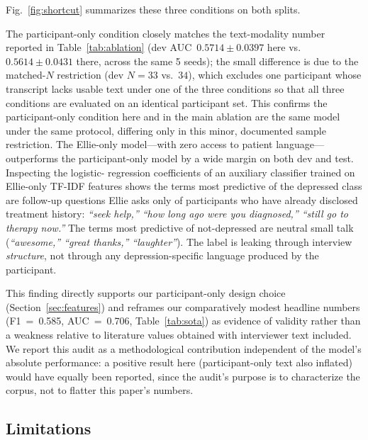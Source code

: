 \documentclass[5p,twocolumn]{elsarticle}
\begin{document}
\noindent Fig.~\ref{fig:shortcut} summarizes these three conditions on
both splits.

The participant-only condition closely matches the text-modality
number reported in Table~\ref{tab:ablation} (dev
AUC~$0.5714\pm0.0397$ here vs.\ $0.5614\pm0.0431$ there, across the
same 5 seeds); the small difference is due to the matched-$N$
restriction (dev $N{=}33$ vs.\ $34$), which excludes one participant
whose transcript lacks usable text under one of the three conditions
so that all three conditions are evaluated on an identical
participant set. This confirms the participant-only condition here
and in the main ablation are the same model under the same protocol,
differing only in this minor, documented sample restriction. The
Ellie-only model---with
zero access to patient language---outperforms the participant-only
model by a wide margin on both dev and test. Inspecting the logistic-
regression coefficients of an auxiliary classifier trained on Ellie-only
TF-IDF features shows the terms most predictive of the depressed class
are follow-up questions Ellie asks only of participants who have
already disclosed treatment history: \emph{``seek help,'' ``how long ago
were you diagnosed,'' ``still go to therapy now.''} The terms most
predictive of not-depressed are neutral small talk (\emph{``awesome,''
``great thanks,'' ``laughter''}). The label is leaking through interview
\emph{structure}, not through any depression-specific language produced
by the participant.

This finding directly supports our participant-only design choice
(Section~\ref{sec:features}) and reframes our comparatively modest
headline numbers (F1~=~0.585, AUC~=~0.706, Table~\ref{tab:sota}) as
evidence of validity rather than a weakness relative to literature
values obtained with interviewer text included. We report this
audit as a methodological contribution independent of the model's
absolute performance: a positive result here (participant-only text
also inflated) would have equally been reported, since the audit's
purpose is to characterize the corpus, not to flatter this paper's
numbers.

\subsection{Limitations}
\label{subsec:limitations}
\end{document}
